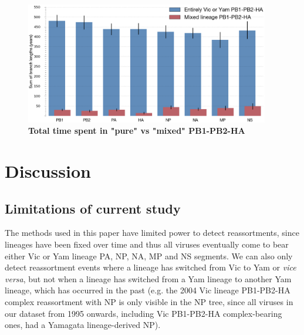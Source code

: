 \documentclass[11pt,oneside,letterpaper]{article}
\begin{document}
\begin{figure}[h]
	\centering		
	\includegraphics[width=0.95\textwidth]{figures/InfB_stateTime.png}
	\caption{\textbf{Total time spent in "pure" vs "mixed" PB1-PB2-HA}}
	\label{stateTime}
\end{figure}

\section*{Discussion}

\subsection*{Limitations of current study}
The methods used in this paper have limited power to detect reassortments, since lineages have been fixed over time and thus all viruses eventually come to bear either Vic or Yam lineage PA, NP, NA, MP and NS segments.
We can also only detect reassortment events where a lineage has switched from Vic to Yam or \textit{vice versa}, but not when a lineage has switched from a Yam lineage to another Yam lineage, which has occurred in the past (e.g. the 2004 Vic lineage PB1-PB2-HA complex reassortment with NP is only visible in the NP tree, since all viruses in our dataset from 1995 onwards, including Vic PB1-PB2-HA complex-bearing ones, had a Yamagata lineage-derived NP).
\end{document}
